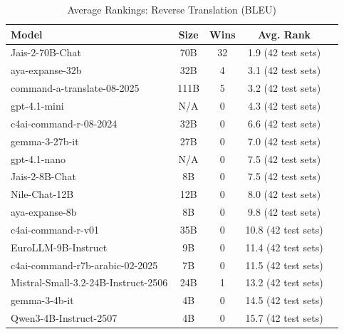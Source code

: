 \begin{table}[htbp]
\centering
\caption{Average Rankings: Reverse Translation (BLEU)}
\label{tab:avg_rankings_bleu}
\begin{tabular}{l@{\hspace{3pt}}c@{\hspace{3pt}}c@{\hspace{3pt}}c@{\hspace{3pt}}c}
\toprule
Model & Size & Wins & Avg. Rank \\
\midrule
Jais-2-70B-Chat & 70B & 32 & 1.9 (42 test sets) \\
aya-expanse-32b & 32B & 4 & 3.1 (42 test sets) \\
command-a-translate-08-2025 & 111B & 5 & 3.2 (42 test sets) \\
gpt-4.1-mini & N/A & 0 & 4.3 (42 test sets) \\
c4ai-command-r-08-2024 & 32B & 0 & 6.6 (42 test sets) \\
gemma-3-27b-it & 27B & 0 & 7.0 (42 test sets) \\
gpt-4.1-nano & N/A & 0 & 7.5 (42 test sets) \\
Jais-2-8B-Chat & 8B & 0 & 7.5 (42 test sets) \\
Nile-Chat-12B & 12B & 0 & 8.0 (42 test sets) \\
aya-expanse-8b & 8B & 0 & 9.8 (42 test sets) \\
c4ai-command-r-v01 & 35B & 0 & 10.8 (42 test sets) \\
EuroLLM-9B-Instruct & 9B & 0 & 11.4 (42 test sets) \\
c4ai-command-r7b-arabic-02-2025 & 7B & 0 & 11.5 (42 test sets) \\
Mistral-Small-3.2-24B-Instruct-2506 & 24B & 1 & 13.2 (42 test sets) \\
gemma-3-4b-it & 4B & 0 & 14.5 (42 test sets) \\
Qwen3-4B-Instruct-2507 & 4B & 0 & 15.7 (42 test sets) \\
\bottomrule
\end{tabular}
\end{table}